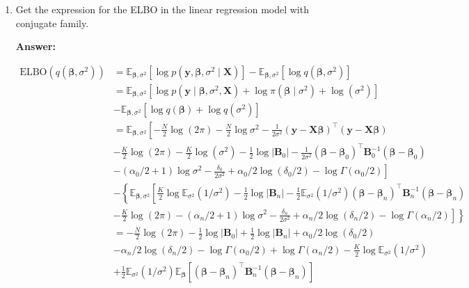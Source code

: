 \begin{enumerate}[leftmargin=*]
\item Get the expression for the ELBO in the linear regression model with conjugate family. 

\textbf{Answer:}

\begin{align*}
	\text{ELBO}(q(\boldsymbol{\beta},\sigma^2))&=\mathbb{E}_{\boldsymbol{\beta},\sigma^2}[\log p(\boldsymbol{y},\boldsymbol{\beta},\sigma^2\mid\boldsymbol{X})]-\mathbb{E}_{\boldsymbol{\beta},\sigma^2}[\log q(\boldsymbol{\beta},\sigma^2)]\\
	&=\mathbb{E}_{\boldsymbol{\beta},\sigma^2}[\log p(\boldsymbol{y}\mid\boldsymbol{\beta},\sigma^2,\boldsymbol{X})+\log \pi(\boldsymbol{\beta}\mid\sigma^2)+\log(\sigma^2)]\\
	&-\mathbb{E}_{\boldsymbol{\beta},\sigma^2}[\log q(\boldsymbol{\beta}) + \log q(\sigma^2)]\\
	&=\mathbb{E}_{\boldsymbol{\beta},\sigma^2}\left[-\frac{N}{2}\log (2\pi)-\frac{N}{2}\log\sigma^2 - \frac{1}{2\sigma^2}(\boldsymbol{y}-\boldsymbol{X}\boldsymbol{\beta})^{\top}(\boldsymbol{y}-\boldsymbol{X}\boldsymbol{\beta})\right.\\
	&\left.-\frac{K}{2}\log(2\pi)-\frac{K}{2}\log(\sigma^2)-\frac{1}{2}\log|\boldsymbol{B}_0|-\frac{1}{2\sigma^2}(\boldsymbol{\beta}-\boldsymbol{\beta}_0)^{\top}\boldsymbol{B}_0^{-1}(\boldsymbol{\beta}-\boldsymbol{\beta}_0)\right.\\
	&-\left.(\alpha_0/2+1)\log\sigma^2-\frac{\delta_0}{2\sigma^2}+\alpha_0/2\log(\delta_0/2)-\log\Gamma(\alpha_0/2)\right]\\
	&-\left\{\mathbb{E}_{\boldsymbol{\beta},\sigma^2}\left[\frac{K}{2}\log\mathbb{E}_{{\sigma^2}}(1/\sigma^2)-\frac{1}{2}\log|\boldsymbol{B}_n|-\frac{1}{2}\mathbb{E}_{{\sigma^2}}(1/\sigma^2)(\boldsymbol{\beta}-\boldsymbol{\beta}_n)^{\top}\boldsymbol{B}_n^{-1}(\boldsymbol{\beta}-\boldsymbol{\beta}_n)\right.\right.\\
	&\left.\left.-\frac{K}{2}\log(2\pi)-(\alpha_n/2+1)\log\sigma^2-\frac{\delta_n}{2\sigma^2}+\alpha_n/2\log(\delta_n/2)-\log\Gamma(\alpha_n/2)\right]\right\}\\
	&=-\frac{N}{2}\log (2\pi)-\frac{1}{2}\log|\boldsymbol{B}_0|+\frac{1}{2}\log|\boldsymbol{B}_n|+\alpha_0/2\log(\delta_0/2)\\
	&-\alpha_n/2\log(\delta_n/2)-\log\Gamma(\alpha_0/2)+\log\Gamma(\alpha_n/2)-\frac{K}{2}\log\mathbb{E}_{{\sigma^2}}(1/\sigma^2)\\
	&+\frac{1}{2}\mathbb{E}_{{\sigma^2}}(1/\sigma^2)\mathbb{E}_{\boldsymbol{\beta}}\left[(\boldsymbol{\beta}-\boldsymbol{\beta}_n)^{\top}\boldsymbol{B}_n^{-1}(\boldsymbol{\beta}-\boldsymbol{\beta}_n)\right]\\

\end{align*}
\end{enumerate}
